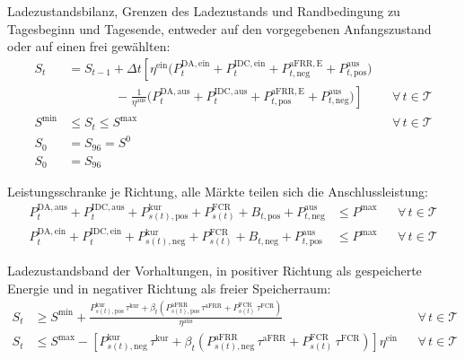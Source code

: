Ladezustandsbilanz, Grenzen des Ladezustands und Randbedingung zu Tagesbeginn und Tagesende, entweder auf den vorgegebenen Anfangszustand oder auf einen frei gewählten:
\begin{align}
    S_t &= S_{t-1} + \Delta t \left[ \eta^{\mathrm{ein}} \Big( P^{\mathrm{DA,ein}}_t + P^{\mathrm{IDC,ein}}_t + P^{\mathrm{aFRR,E}}_{t,\mathrm{neg}} + P^{\mathrm{aus}}_{t,\mathrm{pos}} \Big) \right. \nonumber\\
    &\qquad\qquad \left. - \; \frac{1}{\eta^{\mathrm{aus}}} \Big( P^{\mathrm{DA,aus}}_t + P^{\mathrm{IDC,aus}}_t + P^{\mathrm{aFRR,E}}_{t,\mathrm{pos}} + P^{\mathrm{aus}}_{t,\mathrm{neg}} \Big) \right] && \forall\, t \in \mathcal{T} \label{eq:anh:modell:bilanz}\\
    S^{\min} &\le S_t \le S^{\max} && \forall\, t \in \mathcal{T} \label{eq:anh:modell:grenzen}\\
    S_0 &= S_{96} = S^{0} && \label{eq:anh:modell:rand}\\
    S_0 &= S_{96} && \label{eq:anh:modell:rand_frei}
\end{align}

Leistungsschranke je Richtung, alle Märkte teilen sich die Anschlussleistung:
\begin{align}
    P^{\mathrm{DA,aus}}_t + P^{\mathrm{IDC,aus}}_t + P^{\mathrm{kur}}_{s(t),\mathrm{pos}} + P^{\mathrm{FCR}}_{s(t)} + B_{t,\mathrm{pos}} + P^{\mathrm{aus}}_{t,\mathrm{neg}} &\le P^{\max} && \forall\, t \in \mathcal{T} \label{eq:anh:modell:leistung_aus}\\
    P^{\mathrm{DA,ein}}_t + P^{\mathrm{IDC,ein}}_t + P^{\mathrm{kur}}_{s(t),\mathrm{neg}} + P^{\mathrm{FCR}}_{s(t)} + B_{t,\mathrm{neg}} + P^{\mathrm{aus}}_{t,\mathrm{pos}} &\le P^{\max} && \forall\, t \in \mathcal{T} \label{eq:anh:modell:leistung_ein}
\end{align}

Ladezustandsband der Vorhaltungen, in positiver Richtung als gespeicherte Energie und in negativer Richtung als freier Speicherraum:
\begin{align}
    S_t &\ge S^{\min} + \frac{P^{\mathrm{kur}}_{s(t),\mathrm{pos}} \, \tau^{\mathrm{kur}} + \beta_t \left( P^{\mathrm{aFRR}}_{s(t),\mathrm{pos}} \, \tau^{\mathrm{aFRR}} + P^{\mathrm{FCR}}_{s(t)} \, \tau^{\mathrm{FCR}} \right)}{\eta^{\mathrm{aus}}} && \forall\, t \in \mathcal{T} \label{eq:anh:modell:band_unten}\\
    S_t &\le S^{\max} - \left[ P^{\mathrm{kur}}_{s(t),\mathrm{neg}} \, \tau^{\mathrm{kur}} + \beta_t \left( P^{\mathrm{aFRR}}_{s(t),\mathrm{neg}} \, \tau^{\mathrm{aFRR}} + P^{\mathrm{FCR}}_{s(t)} \, \tau^{\mathrm{FCR}} \right) \right] \eta^{\mathrm{ein}} && \forall\, t \in \mathcal{T} \label{eq:anh:modell:band_oben}
\end{align}

